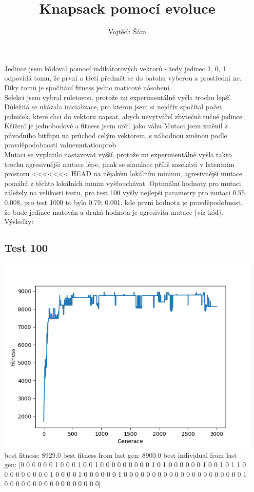 \documentclass{article}
\title{Knapsack pomocí evoluce}
\author{Vojtěch Šára}
\begin{document}
\maketitle
Jedince jsem kódoval pomocí indikátorových vektorů - tedy jedinec 1, 0, 1 odpovídá tomu, že první a třetí předmět se do batohu
vyberou a prostřední ne. Díky tomu je spočítání fitness jedno maticové násobení.\\
Selekci jsem vybral ruletovou, protože mi experimentálně vyšla trochu lepší.\\
Důležitá se ukázala inicializace, pro kterou jsem si nejdřív spočítal počet jedniček, které chci do vektoru napsat, abych nevytvářel
zbytečně tučné jedince.
Křížení je jednobodové a fitness jsem určil jako váhu 
Mutaci jsem změnil z původního bitflipu na průchod celým vektorem, s náhodnou změnou podle pravděpodobnosti valuemutationprob\\
Mutaci se vyplatilo nastavovat vyšší, protože mi experimentálně vyšla
takto trochu agresivnější mutace lépe, jinak se simulace příliš zasekává v latentním prostoru
<<<<<<< HEAD
na nějakém lokálním minimu, agresivnější mutace pomáhá z těchto lokálních minim vyšťouchávat.
Optimální hodnoty pro mutaci záležely na velikosti testu, pro test 100 vyšly nejlepší parametry pro mutaci 0.55, 0.008, pro test 1000
to bylo 0.79, 0.001, kde první hodnota je pravděpodobnost, že bude jedinec mutován a druhá hodnota je agresivita mutace (viz kód).
Výsledky:
\subsection*{Test 100}
\includegraphics{Figure_2.png}
best fitness:  8929.0
best fitness from last gen:  8900.0
best individual from last gen:  [0 0 0 0 0 0 1 0 0 0 1 0 0 1 0 0 0 0 0 0 0 0 0 1 0 1 0 0 0 0 0 0 1 0 0 1 0
 1 1 0 0 0 0 0 0 0 0 0 1 0 0 0 0 1 0 0 0 0 0 0 1 0 0 0 0 0 0 0 0 0 0 0 0 0
 0 0 0 0 0 0 0 0 1 0 0 0 0 0 0 0 0 0 0 0 0 0 0 0 0 0]
\end{document}
